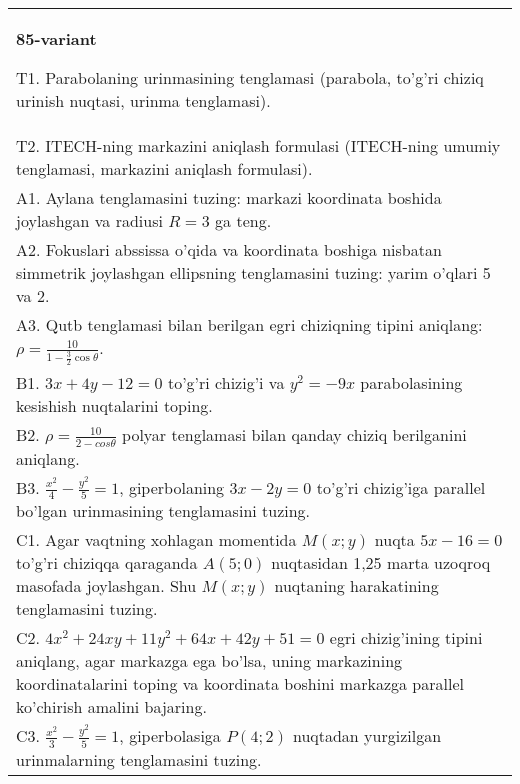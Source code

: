 \documentclass{article}
\begin{document}
\begin{tabular}{m{17cm}}
\textbf{85-variant}
\newline

T1. Parabolaning urinmasining tenglamasi (parabola, to'g'ri chiziq urinish nuqtasi, urinma tenglamasi).\\

T2. ITECH-ning markazini aniqlash formulasi (ITECH-ning umumiy tenglamasi, markazini aniqlash formulasi).\\

A1. Aylana tenglamasini tuzing: markazi koordinata boshida joylashgan va radiusi $R=3$ ga teng.\\

A2. Fokuslari abssissa o'qida va koordinata boshiga nisbatan simmetrik joylashgan ellipsning tenglamasini tuzing: yarim o'qlari 5 va 2.\\

A3. Qutb tenglamasi bilan berilgan egri chiziqning tipini aniqlang: $\rho=\frac{10}{1-\frac{3}{2}\cos\theta}$.\\

B1. $3x + 4y - 12 = 0$ to'g'ri chizig'i va $y^{2} = - 9x$ parabolasining kesishish nuqtalarini toping.\\

B2. $\rho = \frac{10}{2 - cos\theta}$ polyar tenglamasi bilan qanday chiziq berilganini aniqlang.  \\

B3. $\frac{x^{2}}{4} - \frac{y^{2}}{5} = 1$, giperbolaning $3x - 2y = 0$ to'g'ri chizig'iga parallel bo'lgan urinmasining tenglamasini tuzing.  \\

C1. Agar vaqtning xohlagan momentida $M(x;y)$ nuqta $5x - 16 = 0$ to'g'ri chiziqqa qaraganda $A(5;0)$ nuqtasidan 1,25 marta uzoqroq masofada joylashgan. Shu $M(x;y)$ nuqtaning harakatining tenglamasini tuzing.  \\

C2. $4x^{2} + 24xy + 11y^{2} + 64x + 42y + 51 = 0$ egri chizig'ining tipini aniqlang, agar markazga ega bo'lsa, uning markazining koordinatalarini toping va koordinata boshini markazga parallel ko'chirish amalini bajaring.\\

C3. $\frac{x^{2}}{3} - \frac{y^{2}}{5} = 1$, giperbolasiga $P(4;2)$ nuqtadan yurgizilgan urinmalarning tenglamasini tuzing.  \\

\end{tabular}
\vspace{1cm}
\end{document}
